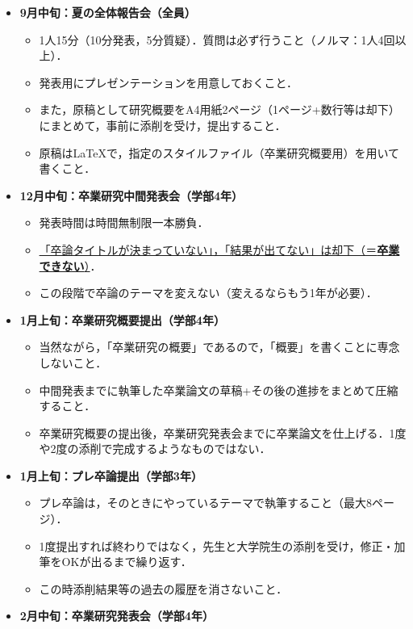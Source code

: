 \documentclass[11pt]{jarticle}
\begin{document}
\begin{breakbox}
	\begin{itemize}
	\item {\bf 9月中旬：夏の全体報告会（全員）}
		\begin{itemize}
		\item 1人15分（10分発表，5分質疑）．質問は必ず行うこと（ノルマ：1人4回以上）．
		\item 発表用にプレゼンテーションを用意しておくこと．
		\item また，原稿として研究概要をA4用紙2ページ（1ページ+数行等は却下）にまとめて，事前に添削を受け，提出すること．
		\item 原稿は\LaTeX で，指定のスタイルファイル（卒業研究概要用）を用いて書くこと．
		\end{itemize}
	\item {\bf 12月中旬：卒業研究中間発表会（学部4年）}
		\begin{itemize}
		\item 発表時間は時間無制限一本勝負．
		\item \underline{「卒論タイトルが決まっていない」，「結果が出てない」は却下（＝{\bf 卒業できない}）}．
		\item この段階で卒論のテーマを変えない（変えるならもう1年が必要）．
		\end{itemize}
	\item {\bf 1月上旬：卒業研究概要提出（学部4年）}
		\begin{itemize}
		\item 当然ながら，「卒業研究の概要」であるので，「概要」を書くことに専念しないこと．
		\item 中間発表までに執筆した卒業論文の草稿+その後の進捗をまとめて圧縮すること．
		\item 卒業研究概要の提出後，卒業研究発表会までに卒業論文を仕上げる．1度や2度の添削で完成するようなものではない．
		\end{itemize}
	\item {\bf 1月上旬：プレ卒論提出（学部3年）}
		\begin{itemize}
		\item プレ卒論は，そのときにやっているテーマで執筆すること（最大8ページ）．
		\item 1度提出すれば終わりではなく，先生と大学院生の添削を受け，修正・加筆をOKが出るまで繰り返す．
		\item この時添削結果等の過去の履歴を消さないこと．
		\end{itemize}
	\item {\bf 2月中旬：卒業研究発表会（学部4年）}
		\begin{itemize}

\end{itemize}
\end{itemize}
\end{breakbox}
\end{document}
